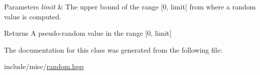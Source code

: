 \begin{DoxyParams}{Parameters}
{\em limit} & The upper bound of the range \mbox{[}0, limit\mbox{[} from where a random value is computed. \\
\hline
\end{DoxyParams}
\begin{DoxyReturn}{Returns}
A pseudo-\/random value in the range \mbox{[}0, limit\mbox{[} 
\end{DoxyReturn}


The documentation for this class was generated from the following file\-:\begin{DoxyCompactItemize}
\item 
include/misc/\hyperlink{random_8hpp}{random.\-hpp}\end{DoxyCompactItemize}
